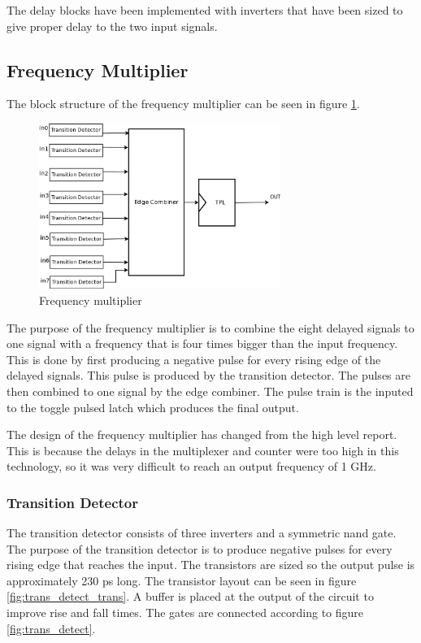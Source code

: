 \documentclass[a4paper,12pt]{article} \usepackage{graphicx}
\begin{document}
The delay blocks have been implemented with inverters that have been
sized to give proper delay to the two input signals.

\subsection{Frequency Multiplier}
The block structure of the frequency multiplier can be seen in figure 
\ref{fig:freq_mult}.
\begin{figure}[p]
        \centering
        \includegraphics[width=0.7\textwidth]{../Bilder/freq_mult_trans.png}
        \caption{Frequency multiplier}
        \label{fig:freq_mult}
\end{figure}

The purpose of the frequency multiplier is to combine the eight delayed signals
to one signal with a frequency that is four times bigger than the input
frequency. This is done by first producing a negative pulse for every rising
edge of the delayed signals. This pulse is produced by the transition detector.
The pulses are then combined to one signal by the edge combiner. The pulse
train is the inputed to the toggle pulsed latch which produces the final output.

The design of the frequency multiplier has changed from the high level report.
This is because the delays in the multiplexer and counter were too high in this
technology, so it was very difficult to reach an output frequency of 1 GHz.

\subsubsection{Transition Detector}
\label{sec:trans_detect}
The transition detector consists of three inverters and a symmetric nand gate.
The purpose of the transition detector is to produce negative pulses for every
rising edge that reaches the input. The transistors are sized so the output
pulse is approximately 230 ps long. The transistor layout can be seen
in figure \ref{fig:trans_detect_trans}.
A buffer is placed at the output of the circuit to improve rise and fall times.
The gates are connected according to figure \ref{fig:trans_detect}.
\end{document}
